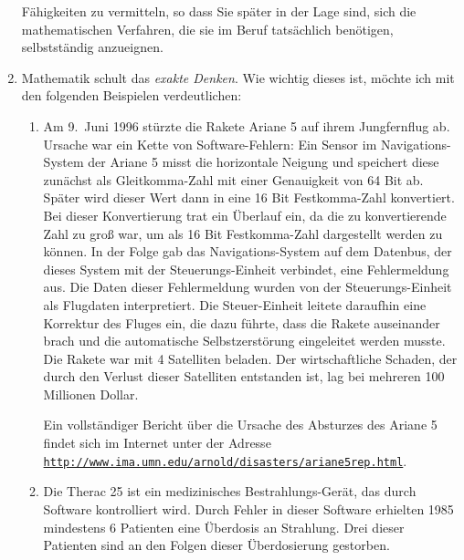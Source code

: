 \begin{enumerate}
      Fähigkeiten zu vermitteln, so dass Sie später in der Lage sind, sich die
      mathematischen Verfahren, die sie  im Beruf tatsächlich benötigen, selbstständig anzueignen.
\item Mathematik schult das \emph{exakte Denken}.  Wie wichtig dieses ist, möchte ich mit den
      folgenden Beispielen verdeutlichen:  
      \begin{enumerate}
      \item Am 9.~Juni 1996 stürzte die Rakete Ariane 5 auf ihrem Jungfernflug ab.
            Ursache war ein Kette von Software-Fehlern:  Ein Sensor im Navigations-System
            der Ariane 5 misst die horizontale Neigung und speichert diese zunächst als Gleitkomma-Zahl
            mit einer Genauigkeit von 64 Bit ab.  Später wird dieser Wert dann in eine 
            16 Bit Festkomma-Zahl konvertiert.
            Bei dieser Konvertierung trat ein Überlauf ein, da die zu konvertierende Zahl
            zu groß war, um als 16 Bit Festkomma-Zahl dargestellt werden zu können.
            In der Folge gab das Navigations-System auf dem Datenbus, der dieses System mit
            der Steuerungs-Einheit verbindet, eine Fehlermeldung aus.
            Die Daten dieser Fehlermeldung wurden von der Steuerungs-Einheit als Flugdaten 
            interpretiert.  Die Steuer-Einheit leitete daraufhin eine Korrektur des
            Fluges ein, die dazu führte, dass die Rakete auseinander brach und die 
            automatische Selbstzerstörung eingeleitet werden musste.
            Die Rakete war mit 4 Satelliten beladen. Der wirtschaftliche Schaden, der durch den Verlust dieser
            Satelliten entstanden ist, lag bei mehreren 100 Millionen Dollar.
            
            Ein vollständiger Bericht über die Ursache des Absturzes des Ariane 5 findet sich
            im Internet unter der Adresse \\[0.2cm]
            \hspace*{1.3cm} 
            \href{http://www.ima.umn.edu/~arnold/disasters/ariane5rep.html}{\texttt{http://www.ima.umn.edu/arnold/disasters/ariane5rep.html}}.
      \item Die Therac 25 ist ein medizinisches Bestrahlungs-Gerät, das durch 
            Software kontrolliert wird.  Durch  Fehler in dieser Software erhielten 1985
            mindestens 6 Patienten eine Überdosis an Strahlung.  Drei dieser Patienten sind an den
            Folgen dieser Überdosierung gestorben. 


\end{enumerate}
\end{enumerate}
